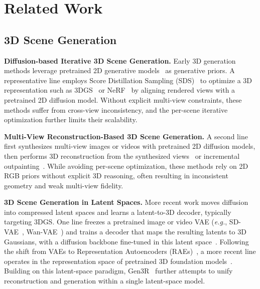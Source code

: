 \section{Related Work}

\subsection{3D Scene Generation}
\textbf{Diffusion-based Iterative 3D Scene Generation.} 
Early 3D generation methods leverage pretrained 2D generative models~\citep{rombach2022high,podell2023sdxl,zhang2023adding,peebles2023scalable} as generative priors. A representative line employs Score Distillation Sampling (SDS)~\citep{lin2023magic3d,poole2022dreamfusion,tang2023dreamgaussian,wang2023prolificdreamer} to optimize a 3D representation such as 3DGS~\citep{kerbl20233d} or NeRF~\citep{mildenhall2021nerf} by aligning rendered views with a pretrained 2D diffusion model. Without explicit multi-view constraints, these methods suffer from cross-view inconsistency, and the per-scene iterative optimization further limits their scalability.

\textbf{Multi-View Reconstruction-Based 3D Scene Generation.}
A second line first synthesizes multi-view images or videos with pretrained 2D diffusion models, then performs 3D reconstruction from the synthesized views~\citep{chen2024mvsplat360,gao2024cat3d,hao2025gaussvideodreamer,liu2024reconx,liu2023syncdreamer,sargent2023zeronvs,shi2023mvdream,sun2024dimensionx,wu2024reconfusion,zhao2024genxd} or incremental outpainting~\citep{chung2023luciddreamer,fridman2023scenescape,schwarz2025recipe,yu2024wonderjourney,yu2025wonderworld}. While avoiding per-scene optimization, these methods rely on 2D RGB priors without explicit 3D reasoning, often resulting in inconsistent geometry and weak multi-view fidelity.

\textbf{3D Scene Generation in Latent Spaces.}
More recent work moves diffusion into compressed latent spaces and learns a latent-to-3D decoder, typically targeting 3DGS. One line freezes a pretrained image or video VAE (\textit{e.g.}, SD-VAE~\citep{podell2023sdxl}, Wan-VAE~\citep{wan2025wan}) and trains a decoder that maps the resulting latents to 3D Gaussians, with a diffusion backbone fine-tuned in this latent space~\citep{yang2025prometheus,go2025splatflow,li2024director3d,li2025flashworld,dai2025fantasyworld,go2025videorfsplat,go2025vist3a,zhou2026drivinggen,wang2025mmgen}. Following the shift from VAEs to Representation Autoencoders (RAEs)~\citep{zheng2025diffusion,shi2025latent,chen2025aligning,bi2025vision}, a more recent line operates in the representation space of pretrained 3D foundation models~\citep{gao2026oneworld,sun2026vggt,jang2026repurposing}. Building on this latent-space paradigm, Gen3R~\citep{huang2026gen3r} further attempts to unify reconstruction and generation within a single latent-space model.



